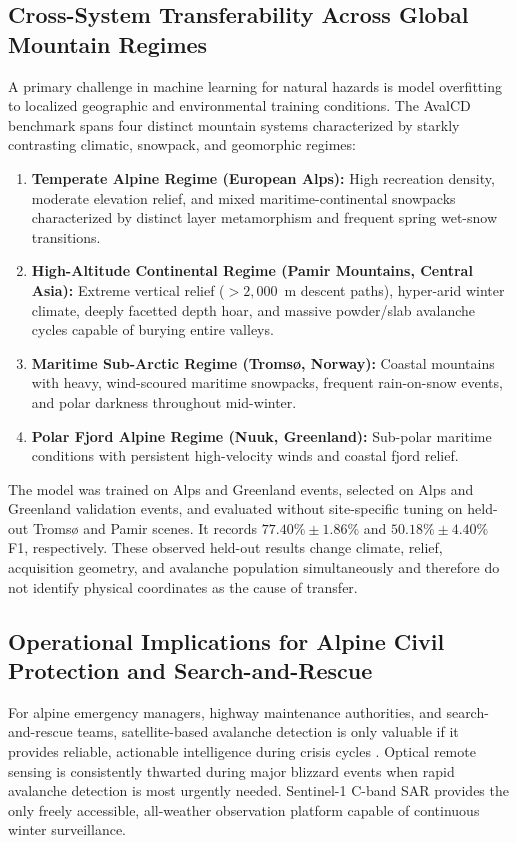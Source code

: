 \subsection{Cross-System Transferability Across Global Mountain Regimes}
\label{sec:disc:transfer}

A primary challenge in machine learning for natural hazards is model overfitting to localized geographic and environmental training conditions. The AvalCD benchmark spans four distinct mountain systems characterized by starkly contrasting climatic, snowpack, and geomorphic regimes:
\begin{enumerate}
    \item \textbf{Temperate Alpine Regime (European Alps):} High recreation density, moderate elevation relief, and mixed maritime-continental snowpacks characterized by distinct layer metamorphism and frequent spring wet-snow transitions.
    \item \textbf{High-Altitude Continental Regime (Pamir Mountains, Central Asia):} Extreme vertical relief ($>2,000$~m descent paths), hyper-arid winter climate, deeply facetted depth hoar, and massive powder/slab avalanche cycles capable of burying entire valleys.
    \item \textbf{Maritime Sub-Arctic Regime (Troms{\o}, Norway):} Coastal mountains with heavy, wind-scoured maritime snowpacks, frequent rain-on-snow events, and polar darkness throughout mid-winter.
    \item \textbf{Polar Fjord Alpine Regime (Nuuk, Greenland):} Sub-polar maritime conditions with persistent high-velocity winds and coastal fjord relief.
\end{enumerate}

The model was trained on Alps and Greenland events, selected on Alps and Greenland validation events, and evaluated without site-specific tuning on held-out Troms{\o} and Pamir scenes. It records $77.40\% \pm 1.86\%$ and $50.18\% \pm 4.40\%$ F1, respectively. These observed held-out results change climate, relief, acquisition geometry, and avalanche population simultaneously and therefore do not identify physical coordinates as the cause of transfer.

\subsection{Operational Implications for Alpine Civil Protection and Search-and-Rescue}
\label{sec:disc:operational}

For alpine emergency managers, highway maintenance authorities, and search-and-rescue teams, satellite-based avalanche detection is only valuable if it provides reliable, actionable intelligence during crisis cycles \citep{eckerstorfer2019near, eaws2022size, techel2018spatial}. Optical remote sensing is consistently thwarted during major blizzard events when rapid avalanche detection is most urgently needed. Sentinel-1 C-band SAR provides the only freely accessible, all-weather observation platform capable of continuous winter surveillance.

